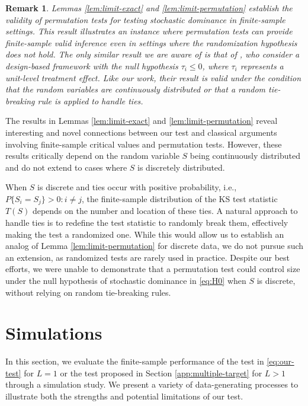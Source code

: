 \documentclass[11pt]{article}
\numberwithin{equation}{section}
\newtheorem{remark}{Remark}%
\begin{document}
\begin{remark}\label{rem:xinran}
Lemmas \ref{lem:limit-exact} and \ref{lem:limit-permutation} establish the validity of permutation tests for testing stochastic dominance in finite-sample settings. This result illustrates an instance where permutation tests can provide finite-sample valid inference even in settings where the randomization hypothesis does not hold. The only similar result we are aware of is that of \cite{caughey/etal:2023}, who consider a design-based framework with the null hypothesis $\tau_i \le 0$, where $\tau_i$ represents a unit-level treatment effect. Like our work, their result is valid under the condition that the random variables are continuously distributed or that a random tie-breaking rule is applied to handle ties.
\end{remark}

The results in Lemmas \ref{lem:limit-exact} and \ref{lem:limit-permutation} reveal interesting and novel connections between our test and classical arguments involving finite-sample critical values and permutation tests. However, these results critically depend on the random variable $S$ being continuously distributed and do not extend to cases where $S$ is discretely distributed.

When \( S \) is discrete and ties occur with positive probability, i.e., \( P\{S_i = S_{j}\} > 0: i\not=j \), the finite-sample distribution of the KS test statistic \( T(S) \) depends on the number and location of these ties. A natural approach to handle ties is to redefine the test statistic to randomly break them, effectively making the test a randomized one. While this would allow us to establish an analog of Lemma \ref{lem:limit-permutation} for discrete data, we do not pursue such an extension, as randomized tests are rarely used in practice. Despite our best efforts, we were unable to demonstrate that a permutation test could control size under the null hypothesis of stochastic dominance in \eqref{eq:H0} when $S$ is discrete, without relying on random tie-breaking rules. 


\section{Simulations}\label{sec:simulations}

In this section, we evaluate the finite-sample performance of the test in \eqref{eq:our-test} for $L=1$ or the test proposed in Section \ref{app:multiple-target} for $L>1$ through a simulation study. We present a variety of data-generating processes to illustrate both the strengths and potential limitations of our test.
\end{document}
